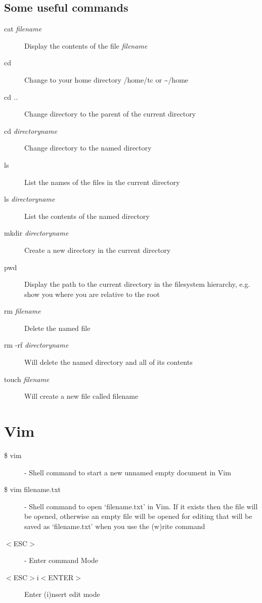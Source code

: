\documentclass[12pt, a4paper, twoside]{book}
\begin{document}
\subsection{Some useful commands}
\begin{description}
\item[cat \emph{filename}] Display the contents of the file \emph{filename}
\item[cd] Change to your home directory /home/tc or \textasciitilde/home
\item[cd \emph{..}] Change directory to the parent of the current directory
\item[cd \emph{directoryname}] Change directory to the named directory
\item[ls] List the names of the files in the current directory
\item[ls  \emph{directoryname}] List the contents of the named directory
\item[mkdir \emph{directoryname}] Create a new directory in the current directory
\item[pwd] Display the path to the current directory in the filesystem hierarchy, e.g. show you where you are relative to the root
\item[rm \emph{filename}] Delete the named file
\item[rm -rf \emph{directoryname}] Will delete the named directory and all of its contents
\item[touch \emph{filename}] Will create a new file called filename
\end{description}

\section{Vim}
\label{cribsheet_vim}
\begin{description}
\item[\$ vim] - Shell command to start a new unnamed empty document in Vim
\item[\$ vim filename.txt] - Shell command to open `filename.txt' in Vim. If it exists then the file will be opened, otherwise an empty file will be opened for editing that will be saved as `filename.txt' when you use the (w)rite command
\item[$<$ESC$>$] - Enter command Mode
\item[$<$ESC$>$i$<$ENTER$>$] Enter (i)nsert edit mode
\end{description}
\end{document}
